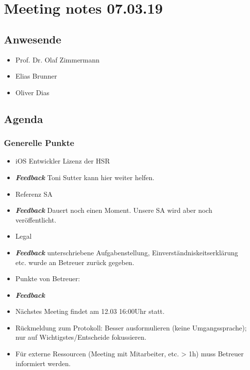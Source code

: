 \hypertarget{meeting-notes-070319}{%
\section*{Meeting notes 07.03.19}\label{meeting-notes-070319}}

\hypertarget{anwesende}{%
\subsection*{Anwesende}\label{anwesende}}

\begin{itemize}

\item
  Prof. Dr. Olaf Zimmermann
\item
  Elias Brunner
\item
  Oliver Dias
\end{itemize}

\hypertarget{agenda}{%
\subsection*{Agenda}\label{agenda}}

\hypertarget{generelle-punkte}{%
\subsubsection*{Generelle Punkte}\label{generelle-punkte}}

\begin{itemize}

\item
  iOS Entwickler Lizenz der HSR 
\item \emph{\textbf{Feedback}} Toni Sutter kann hier weiter helfen.
\item
  Referenz SA 
\item \emph{\textbf{Feedback}} Dauert noch einen Moment. Unsere SA wird aber noch veröffentlicht.
\item
  Legal 
\item \emph{\textbf{Feedback}} unterschriebene Aufgabenstellung, Einverständniskeitserklärung etc. wurde  an Betreuer zurück gegeben.
\item
  Punkte von Betreuer: 
\item \emph{\textbf{Feedback}}
\item
  Nächstes Meeting findet am 12.03 16:00Uhr statt.
\item
  Rückmeldung zum Protokoll: Besser ausformulieren (keine
  Umgangssprache); nur auf Wichtigstes/Entscheide fokussieren.
\item
  Für externe Ressourcen (Meeting mit Mitarbeiter, etc. \textgreater{}
  1h) muss Betreuer informiert werden.
\end{itemize}

